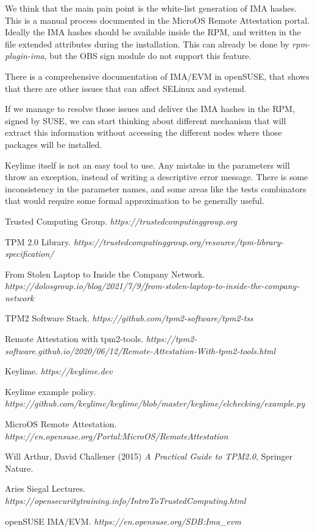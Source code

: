 \documentclass{article}
\begin{document}
We think that the main pain point is the white-list generation of IMA
hashes.  This is a manual process documented in the MicroOS Remote
Attestation portal.  Ideally the IMA hashes should be available inside
the RPM, and written in the file extended attributes during the
installation.  This can already be done by \emph{rpm-plugin-ima}, but
the OBS sign module do not support this feature.

There is a comprehensive documentation of IMA/EVM in
openSUSE\cite{ima}, that shows that there are other issues that can
affect SELinux and systemd.

If we manage to resolve those issues and deliver the IMA hashes in the
RPM, signed by SUSE, we can start thinking about different mechanism
that will extract this information without accessing the different
nodes where those packages will be installed.

Keylime itself is not an easy tool to use.  Any mistake in the
parameters will throw an exception, instead of writing a descriptive
error message.  There is some inconsistency in the parameter names,
and some areas like the tests combinators that would require some
formal approximation to be generally useful.

\begin{thebibliography}{9}
  Trusted Computing Group. \emph{https://trustedcomputinggroup.org}

  TPM 2.0 Library. \emph{https://trustedcomputinggroup.org/resource/tpm-library-specification/}

  From Stolen Laptop to Inside the Company Network. \emph{https://dolosgroup.io/blog/2021/7/9/from-stolen-laptop-to-inside-the-company-network}

  TPM2 Software Stack. \emph{https://github.com/tpm2-software/tpm2-tss}

  Remote Attestation with tpm2-tools. \emph{https://tpm2-software.github.io/2020/06/12/Remote-Attestation-With-tpm2-tools.html}

  Keylime. \emph{https://keylime.dev}

  Keylime example policy. \emph{https://github.com/keylime/keylime/blob/master/keylime/elchecking/example.py}

  MicroOS Remote Attestation. \emph{https://en.opensuse.org/Portal:MicroOS/RemoteAttestation}

  Will Arthur, David Challener (2015) \emph{A Practical Guide to TPM2.0}, Springer Nature.

  Aries Siegal Lectures. \emph{https://opensecuritytraining.info/IntroToTrustedComputing.html}

  openSUSE IMA/EVM. \emph{https://en.opensuse.org/SDB:Ima\_evm}
\end{thebibliography}
\end{document}
